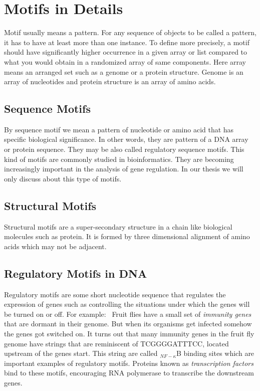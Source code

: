 \section{Motifs in Details}
Motif usually means a pattern. For any sequence
of objects to be called a pattern, it has to have at least
more than one instance. To define more precisely, a motif
should have significantly higher occurrence in a given array
or list compared to what you would obtain in a randomized
array of same components. Here array means an arranged set
such as a genome or a protein structure. Genome is an array
of nucleotides and protein structure is an array of amino acids.

\subsection{Sequence Motifs}
By sequence motif we mean a pattern
of nucleotide or amino acid that has specific biological
significance. In other words, they are pattern of a DNA array or
protein sequence. They may be also called regulatory sequence
motifs. This kind of motifs are commonly studied in bioinformatics.
They are becoming increasingly important in the analysis of gene
regulation. In our thesis we will only discuss about this type of motifs.

\subsection{Structural Motifs}
Structural motifs are a super-secondary
structure in a chain like biological molecules such as protein.
It is formed by three dimensional alignment of amino acids
which may not be adjacent.

\subsection{Regulatory Motifs in DNA}
Regulatory motifs are some short nucleotide
sequence that regulates the expression of genes such as controlling
the situations under which the genes will be turned on or off.
For example:~\cite{jones2004introduction} Fruit flies have a small
set of \textit{immunity genes} that are dormant
in their genome. But when its organisms get infected somehow the genes
got switched on. It turns out that many immunity genes in
the fruit fly genome have strings that are reminiscent of TCGGGGATTTCC,
located upstream of the genes start. This string are called $ _{NF-\kappa}$B
binding sites which are important examples of regulatory motifs. Proteins
known as \textit{transcription factors} bind to these motifs, encouraging
RNA polymerase to transcribe the downstream genes.

